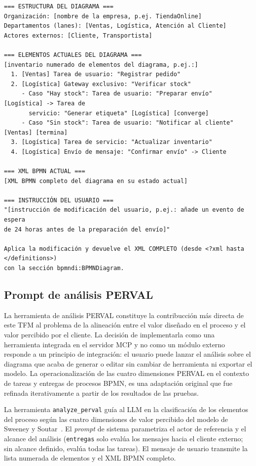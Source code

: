 \begin{lstlisting}[style=promptbox]
=== ESTRUCTURA DEL DIAGRAMA ===
Organización: [nombre de la empresa, p.ej. TiendaOnline]
Departamentos (lanes): [Ventas, Logística, Atención al Cliente]
Actores externos: [Cliente, Transportista]

=== ELEMENTOS ACTUALES DEL DIAGRAMA ===
[inventario numerado de elementos del diagrama, p.ej.:]
  1. [Ventas] Tarea de usuario: "Registrar pedido"
  2. [Logística] Gateway exclusivo: "Verificar stock"
     - Caso "Hay stock": Tarea de usuario: "Preparar envío" [Logística] -> Tarea de
       servicio: "Generar etiqueta" [Logística] [converge]
     - Caso "Sin stock": Tarea de usuario: "Notificar al cliente" [Ventas] [termina]
  3. [Logística] Tarea de servicio: "Actualizar inventario"
  4. [Logística] Envío de mensaje: "Confirmar envío" -> Cliente

=== XML BPMN ACTUAL ===
[XML BPMN completo del diagrama en su estado actual]

=== INSTRUCCIÓN DEL USUARIO ===
"[instrucción de modificación del usuario, p.ej.: añade un evento de espera
de 24 horas antes de la preparación del envío]"

Aplica la modificación y devuelve el XML COMPLETO (desde <?xml hasta </definitions>)
con la sección bpmndi:BPMNDiagram.
\end{lstlisting}

\subsection{Prompt de análisis PERVAL}
\label{subsec:promptPerval}

La herramienta de análisis PERVAL constituye la contribucción más directa de este TFM al problema de la alineación entre el valor diseñado en el proceso y el valor percibido por el cliente. La decisión de implementarla como una herramienta integrada en el servidor MCP y no como un módulo externo responde a un principio de integración: el usuario puede lanzar el análisis sobre el diagrama que acaba de generar o editar sin cambiar de herramienta ni exportar el modelo. La operacionalización de las cuatro dimensiones PERVAL en el contexto de tareas y entregas de procesos BPMN, es una adaptación original que fue refinada iterativamente a partir de los resultados de las pruebas.

La herramienta \texttt{analyze\_perval} guía al LLM en la clasificación de los elementos del proceso según las cuatro dimensiones de valor percibido del modelo de Sweeney y Soutar~\cite{sweeney2001perval}. El \textit{prompt} de sistema parametriza el actor de referencia y el alcance del análisis (\texttt{entregas} solo evalúa los mensajes hacia el cliente externo; sin alcance definido, evalúa todas las tareas). El mensaje de usuario transmite la lista numerada de elementos y el XML BPMN completo.

